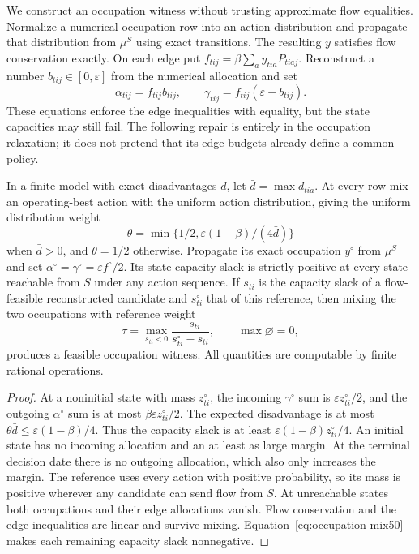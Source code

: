 We construct an occupation witness without trusting approximate flow equalities. Normalize a numerical occupation row into an action distribution and propagate that distribution from $\mu^S$ using exact transitions. The resulting $y$ satisfies flow conservation exactly. On each edge put $f_{tij}=\beta\sum_a y_{tia}P_{tiaj}$. Reconstruct a number $b_{tij}\in[0,\varepsilon]$ from the numerical allocation and set
\[
 \alpha_{tij}=f_{tij}b_{tij},\qquad
 \gamma_{tij}=f_{tij}(\varepsilon-b_{tij}).
\]
These equations enforce the edge inequalities with equality, but the state capacities may still fail. The following repair is entirely in the occupation relaxation; it does not pretend that its edge budgets already define a common policy.

\begin{lemma}\label{lem:occupation-repair50}
In a finite model with exact disadvantages $d$, let $\bar d=\max d_{tia}$. At every row mix an operating-best action with the uniform action distribution, giving the uniform distribution weight
\[
 \theta=\min\{1/2,\varepsilon(1-\beta)/(4\bar d)\}
\]
when $\bar d>0$, and $\theta=1/2$ otherwise. Propagate its exact occupation $y^\circ$ from $\mu^S$ and set $\alpha^\circ=\gamma^\circ=\varepsilon f^\circ/2$. Its state-capacity slack is strictly positive at every state reachable from $S$ under any action sequence. If $s_{ti}$ is the capacity slack of a flow-feasible reconstructed candidate and $s^\circ_{ti}$ that of this reference, then mixing the two occupations with reference weight
\begin{equation}\label{eq:occupation-mix50}
 \tau=\max_{s_{ti}<0}\frac{-s_{ti}}{s^\circ_{ti}-s_{ti}},
 \qquad \max\varnothing=0,
\end{equation}
produces a feasible occupation witness. All quantities are computable by finite rational operations.
\end{lemma}
\begin{proof}
At a noninitial state with mass $z^\circ_{ti}$, the incoming $\gamma^\circ$ sum is $\varepsilon z^\circ_{ti}/2$, and the outgoing $\alpha^\circ$ sum is at most $\beta\varepsilon z^\circ_{ti}/2$. The expected disadvantage is at most $\theta\bar d\le\varepsilon(1-\beta)/4$. Thus the capacity slack is at least $\varepsilon(1-\beta)z^\circ_{ti}/4$. An initial state has no incoming allocation and an at least as large margin. At the terminal decision date there is no outgoing allocation, which also only increases the margin. The reference uses every action with positive probability, so its mass is positive wherever any candidate can send flow from $S$. At unreachable states both occupations and their edge allocations vanish. Flow conservation and the edge inequalities are linear and survive mixing. Equation~\eqref{eq:occupation-mix50} makes each remaining capacity slack nonnegative.\end{proof}


